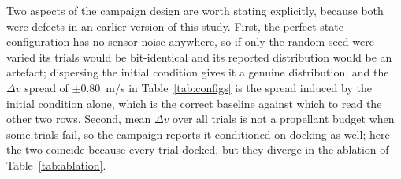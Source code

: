 Two aspects of the campaign design are worth stating explicitly, because both
were defects in an earlier version of this study. First, the perfect-state
configuration has no sensor noise anywhere, so if only the random seed were
varied its trials would be bit-identical and its reported distribution would
be an artefact; dispersing the initial condition gives it a genuine
distribution, and the $\Delta v$ spread of $\pm 0.80$~m/s in
Table~\ref{tab:configs} is the spread induced by the initial condition alone,
which is the correct baseline against which to read the other two rows.
Second, mean $\Delta v$ over all trials is not a propellant budget when some
trials fail, so the campaign reports it conditioned on docking as well; here
the two coincide because every trial docked, but they diverge in the ablation
of Table~\ref{tab:ablation}.
